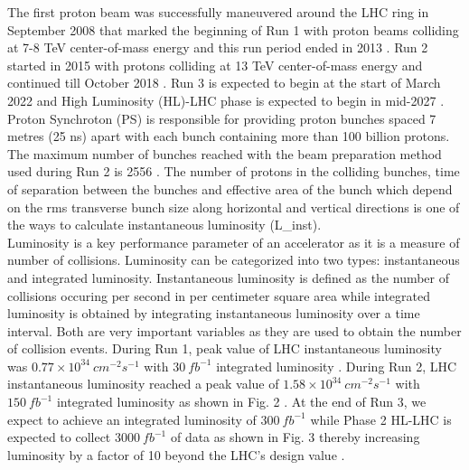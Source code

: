 The first proton beam was successfully maneuvered around the LHC ring in September 2008 that marked the beginning of Run 1 with proton beams colliding at 7-8 TeV center-of-mass energy and this run period ended in 2013 \cite{cmsrun} \cite{Alemany-Fernandez:1631030}. Run 2 started in 2015 with protons colliding at 13 TeV center-of-mass energy and continued till October 2018 \cite{Wenninger:2668326}. Run 3 is expected to begin at the start of March 2022 and High Luminosity (HL)-LHC phase is expected to begin in mid-2027 \cite{Dainese:2019rgk}. Proton Synchroton (PS) is responsible for providing proton bunches spaced 7 metres (25 ns) apart with each bunch containing more than 100 billion protons. The maximum number of bunches reached with the beam preparation method used during Run 2 is 2556 \cite{Wenninger:2668326}. The number of protons in the colliding bunches, time of separation between the bunches and effective area of the bunch which depend on the rms transverse bunch size along horizontal and vertical directions is one of the ways to calculate instantaneous luminosity (L_{inst}). \\

Luminosity is a key performance parameter of an accelerator as it is a measure of number of collisions. Luminosity can be categorized into two types: instantaneous and integrated luminosity. Instantaneous luminosity is defined as the number of collisions occuring per second in per centimeter square area while integrated luminosity is obtained by integrating instantaneous luminosity over a time interval. Both are very important variables as they are used to obtain the number of collision events. During Run 1, peak value of LHC instantaneous luminosity was $0.77 \times 10^{34} \: cm^{-2} s^{-1} $ with $30 \: fb^{-1}$ integrated luminosity \cite{cmsrun1lumi}  . During Run 2, LHC instantaneous luminosity reached a peak value of $1.58 \times 10^{34}  \: cm^{-2} s^{-1}$ with $150 \: fb^{-1}$ integrated luminosity as shown in Fig. 2 \cite{CMS:2018elu}. At the end of Run 3, we expect to achieve an integrated luminosity  of $300 \:fb^{-1}$ while Phase 2 HL-LHC is expected to collect $3000 \:fb^{-1}$ of data as shown in Fig. 3 thereby increasing luminosity by a factor of 10 beyond the LHC's design value \cite{Dainese:2019rgk}. \\


